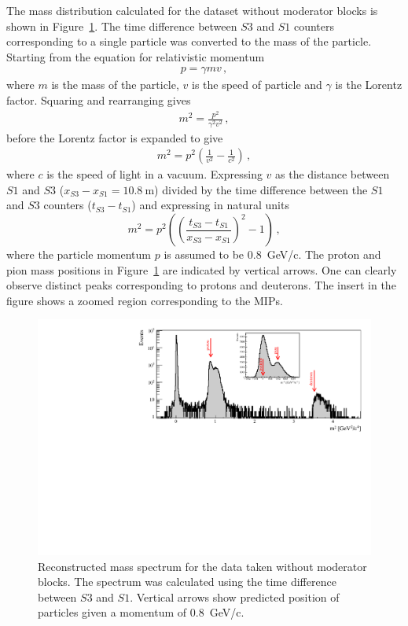 The mass distribution calculated for the dataset without moderator blocks is shown in Figure~\ref{fig:s3tof_mass}.
The time difference between $\mathit{S3}$ and $\mathit{S1}$ counters corresponding to a single particle was converted to the mass of the particle.
Starting from the equation for relativistic momentum
\begin{align}
p = \gamma m v \,,
\end{align}
where $m$ is the mass of the particle, $v$ is the speed of particle and $\gamma$ is the Lorentz factor.
Squaring and rearranging gives
\begin{align}
  m^{2} = \frac{p^{2}}{\gamma^{2} v^{2}} \,,
\end{align}
before the Lorentz factor is expanded to give
\begin{align}
  m^{2} = p^{2}\left(\frac{1}{v^{2}} - \frac{1}{c^{2}}\right) \,,
\end{align}
where $c$ is the speed of light in a vacuum. Expressing $v$ as the distance between $\mathit{S1}$ and $\mathit{S3}$ ($x_{\mathit{S3}}-x_{\mathit{S1}} = 10.8~\text{m}$) divided by the time difference between the $\mathit{S1}$ and $\mathit{S3}$ counters ($t_{\mathit{S3}} - t_{\mathit{S1}}$) and expressing in natural units 
\begin{equation} 
  m^2 = p^2 \left( 
  \left(\frac{t_{\mathit{S3}}-t_{\mathit{S1}}}{x_{\mathit{S3}}-x_{\mathit{S1}}} \right)^2
  - 1  \right) \,,
  \label{eq:recoMass}
\end{equation}
where the particle momentum $p$ is assumed to be 0.8~GeV/c.
The proton and pion mass positions in Figure~\ref{fig:s3tof_mass} are indicated by vertical arrows.
One can clearly observe distinct peaks corresponding to protons and deuterons. 
The insert in the figure shows a zoomed region corresponding to the MIPs. 

\begin{figure}[ht]
  \centering
  \includegraphics[width=0.9\linewidth]{files/Figures/Data_2018_8_31_b2_800MeV_0block_All.pdf}
  \caption{Reconstructed mass spectrum for the data taken without moderator blocks. The spectrum was calculated using the time difference between $\mathit{S3}$ and $\mathit{S1}$. Vertical arrows show predicted position of particles given a momentum of 0.8~GeV/c.}
  \label{fig:s3tof_mass}
\end{figure}

